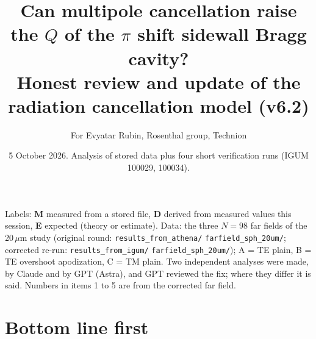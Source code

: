 \documentclass[11pt,a4paper]{article}
\title{Can multipole cancellation raise the $Q$ of the $\pi$ shift sidewall Bragg cavity?\\[2pt]
\large Honest review and update of the radiation cancellation model (v6.2)}
\author{For Evyatar Rubin, Rosenthal group, Technion}
\date{5 October 2026. Analysis of stored data plus four short verification runs (IGUM 100029, 100034).}
\begin{document}
\maketitle

Labels: \textbf{M} measured from a stored file, \textbf{D} derived from measured values this session,
\textbf{E} expected (theory or estimate). Data: the three $N=98$ far fields of the 20\,$\mu$m study
(original round: \texttt{results\_from\_athena/} \texttt{farfield\_sph\_20um/}; corrected re-run:
\texttt{results\_from\_igum/} \texttt{farfield\_sph\_20um/}); A = TE plain, B = TE overshoot apodization,
C = TM plain. Two independent analyses were made, by Claude and by GPT (Astra), and GPT reviewed the fix; where
they differ it is said. Numbers in items 1 to 5 are from the corrected far field.

\section{Bottom line first}
\end{document}
